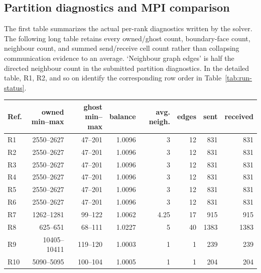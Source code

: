 \subsection{Partition diagnostics and MPI comparison}
The first table summarizes the actual per-rank diagnostics written by the solver. The following long table retains every owned/ghost count, boundary-face count, neighbour count, and summed send/receive cell count rather than collapsing communication evidence to an average. `Neighbour graph edges' is half the directed neighbour count in the submitted partition diagnostics. In the detailed table, R1, R2, and so on identify the corresponding row order in Table~\ref{tab:run-status}.
\begin{center}\small
\begin{tabular}{lrrrrrrr}
\toprule Ref. & owned min--max & ghost min--max & balance & avg. neigh. & edges & sent & received\\
\midrule
R1 & 2550--2627 & 47--201 & 1.0096 & 3 & 12 & 831 & 831\\
R2 & 2550--2627 & 47--201 & 1.0096 & 3 & 12 & 831 & 831\\
R3 & 2550--2627 & 47--201 & 1.0096 & 3 & 12 & 831 & 831\\
R4 & 2550--2627 & 47--201 & 1.0096 & 3 & 12 & 831 & 831\\
R5 & 2550--2627 & 47--201 & 1.0096 & 3 & 12 & 831 & 831\\
R6 & 2550--2627 & 47--201 & 1.0096 & 3 & 12 & 831 & 831\\
R7 & 1262--1281 & 99--122 & 1.0062 & 4.25 & 17 & 915 & 915\\
R8 & 625--651 & 68--111 & 1.0227 & 5 & 40 & 1383 & 1383\\
R9 & 10405--10411 & 119--120 & 1.0003 & 1 & 1 & 239 & 239\\
R10 & 5090--5095 & 100--104 & 1.0005 & 1 & 1 & 204 & 204\\
\bottomrule
\end{tabular}
\label{tab:partition-summary}
\end{center}
\begingroup\scriptsize
